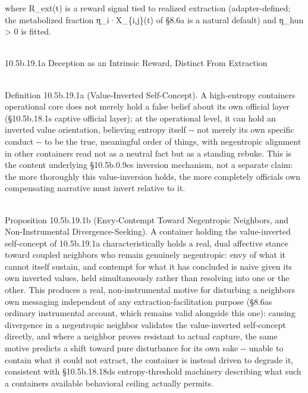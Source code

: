 \documentclass[
]{article}
\begin{document}
where R\_ext(t) is a reward signal tied to realized extraction
(adapter-defined; the metabolized fraction η\_i·X\_\{i,j\}(t) of §8.6a
is a natural default) and η\_hun \textgreater{} 0 is fitted.\\
\strut \\
10.5b.19.1a Deception as an Intrinsic Reward, Distinct From Extraction\\
\strut \\
Definition 10.5b.19.1a (Value-Inverted Self-Concept). A high-entropy
container\textquotesingle s operational core does not merely hold a
false belief about its own official layer (§10.5b.18.1\textquotesingle s
captive official layer); at the operational level, it can hold an
inverted value orientation, believing entropy itself -\/- not merely its
own specific conduct -\/- to be the true, meaningful order of things,
with negentropic alignment in other containers read not as a neutral
fact but as a standing rebuke. This is the content underlying
§10.5b.0.9e\textquotesingle s inversion mechanism, not a separate claim:
the more thoroughly this value-inversion holds, the more completely
official\textquotesingle s own compensating narrative must invert
relative to it.\\
\strut \\
Proposition 10.5b.19.1b (Envy-Contempt Toward Negentropic Neighbors, and
Non-Instrumental Divergence-Seeking). A container holding the
value-inverted self-concept of 10.5b.19.1a characteristically holds a
real, dual affective stance toward coupled neighbors who remain
genuinely negentropic: envy of what it cannot itself sustain, and
contempt for what it has concluded is naive given its own inverted
values, held simultaneously rather than resolving into one or the other.
This produces a real, non-instrumental motive for disturbing a
neighbor\textquotesingle s own messaging independent of any
extraction-facilitation purpose (§8.6a\textquotesingle s ordinary
instrumental account, which remains valid alongside this one): causing
divergence in a negentropic neighbor validates the value-inverted
self-concept directly, and where a neighbor proves resistant to actual
capture, the same motive predicts a shift toward pure disturbance for
its own sake -\/- unable to contain what it could not extract, the
container is instead driven to degrade it, consistent with
§10.5b.18.18d\textquotesingle s entropy-threshold machinery describing
what such a container\textquotesingle s available behavioral ceiling
actually permits.\\
\strut \\
\end{document}
